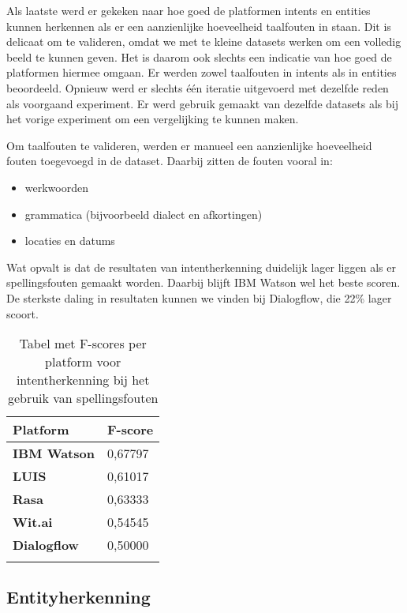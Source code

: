 Als laatste werd er gekeken naar hoe goed de platformen intents en entities kunnen herkennen als er een aanzienlijke hoeveelheid taalfouten in staan. Dit is delicaat om te valideren, omdat we met te kleine datasets werken om een volledig beeld te kunnen geven. Het is daarom ook slechts een indicatie van hoe goed de platformen hiermee omgaan. Er werden zowel taalfouten in intents als in entities beoordeeld. Opnieuw werd er slechts één iteratie uitgevoerd met dezelfde reden als voorgaand experiment. Er werd gebruik gemaakt van dezelfde datasets als bij het vorige experiment om een vergelijking te kunnen maken.

Om taalfouten te valideren, werden er manueel een aanzienlijke hoeveelheid fouten toegevoegd in de dataset. Daarbij zitten de fouten vooral in:
\begin{itemize}
    \item werkwoorden 
    \item grammatica (bijvoorbeeld dialect en afkortingen)
    \item locaties en datums
\end{itemize}

Wat opvalt is dat de resultaten van intentherkenning duidelijk lager liggen als er spellingsfouten gemaakt worden. Daarbij blijft IBM Watson wel het beste scoren. De sterkste daling in resultaten kunnen we vinden bij Dialogflow, die 22\% lager scoort.

\begin{center}
    \begin{longtable}{| l | l |}
        \hline
        \textbf{Platform} & \textbf{F-score} \\ \hline
        \textbf{IBM Watson} & 0,67797 \\ \hline  
        \textbf{LUIS} & 0,61017 \\ \hline  
        \textbf{Rasa} & 0,63333 \\ \hline  
        \textbf{Wit.ai} & 0,54545  \\ \hline  
        \textbf{Dialogflow} & 0,50000 \\ \hline  
        \caption{Tabel met F-scores per platform voor intentherkenning bij het gebruik van spellingsfouten}                                    
    \end{longtable}
    \label{tbl:results-intent-spelling}
\end{center}

\subsection{Entityherkenning}


